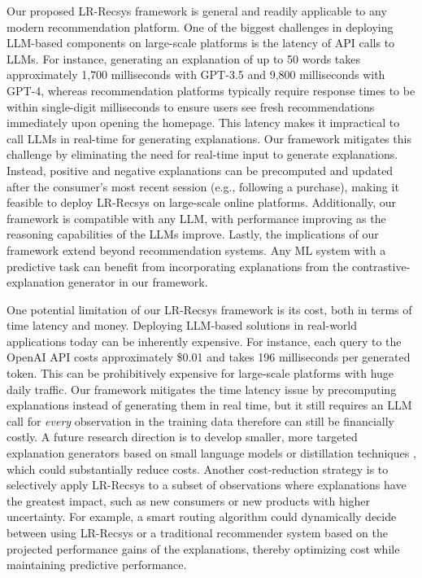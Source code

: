 Our proposed LR-Recsys framework is general and readily applicable to any modern recommendation platform. One of the biggest challenges in deploying LLM-based components on large-scale platforms is the latency of API calls to LLMs. For instance, generating an explanation of up to 50 words takes approximately 1,700 milliseconds with GPT-3.5 and 9,800 milliseconds with GPT-4, whereas recommendation platforms typically require response times to be within single-digit milliseconds to ensure users see fresh recommendations immediately upon opening the homepage. This latency makes it impractical to call LLMs in real-time for generating explanations. Our framework mitigates this challenge by eliminating the need for real-time input to generate explanations. Instead, positive and negative explanations can be precomputed and updated after the consumer's most recent session (e.g., following a purchase), making it feasible to deploy LR-Recsys on large-scale online platforms. Additionally, our framework is compatible with any LLM, with performance improving as the reasoning capabilities of the LLMs improve. Lastly, the implications of our framework extend beyond recommendation systems. Any ML system with a predictive task can benefit from incorporating explanations from the contrastive-explanation generator in our framework. 


One potential limitation of our LR-Recsys framework is its cost, both in terms of time latency and money. Deploying LLM-based solutions in real-world applications today can be inherently expensive. For instance, each query to the OpenAI API costs approximately \$0.01 and takes 196 milliseconds per generated token. This can be prohibitively expensive for large-scale platforms with huge daily traffic. Our framework mitigates the time latency issue by precomputing explanations instead of generating them in real time, but it still requires an LLM call for \emph{every} observation in the training data therefore can still be financially costly. A future research direction is to develop smaller, more targeted explanation generators based on small language models \citep{schick2020s} or distillation techniques \citep{hinton2015distilling, gu2024minillm}, which could substantially reduce costs. Another cost-reduction strategy is to selectively apply LR-Recsys to a subset of observations where explanations have the greatest impact, such as new consumers or new products with higher uncertainty. For example, a smart routing algorithm could dynamically decide between using LR-Recsys or a traditional recommender system based on the projected performance gains of the explanations, thereby optimizing cost while maintaining predictive performance.


